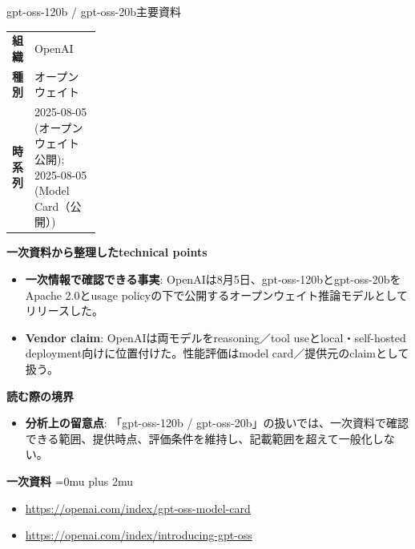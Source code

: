 \begin{technicalnote}{gpt-oss-120b / gpt-oss-20b}{主要資料}
\begingroup
\begin{tabularx}{\linewidth}{@{}>{\bfseries}p{0.22\linewidth}X@{}}
組織 & OpenAI \\
種別 & オープンウェイト \\
時系列 & 2025-08-05 (オープンウェイト公開); 2025-08-05 (Model Card（公開）) \\
\end{tabularx}
\smallskip
{\bfseries 一次資料から整理したtechnical points}
\begin{itemize}[leftmargin=1.5em,itemsep=0.35em]
\item \textbf{一次情報で確認できる事実}: OpenAIは8月5日、gpt-oss-120bとgpt-oss-20bをApache 2.0とusage policyの下で公開するオープンウェイト推論モデルとしてリリースした。
\item \textbf{Vendor claim}: OpenAIは両モデルをreasoning／tool useとlocal・self-hosted deployment向けに位置付けた。性能評価はmodel card／提供元のclaimとして扱う。
\end{itemize}
\begin{minipage}{\linewidth}
{\bfseries 読む際の境界}
\begin{itemize}[leftmargin=1.5em,itemsep=0.35em]
\item \textbf{分析上の留意点}: 「gpt-oss-120b / gpt-oss-20b」の扱いでは、一次資料で確認できる範囲、提供時点、評価条件を維持し、記載範囲を超えて一般化しない。
\end{itemize}
\begin{samepage}
{\bfseries 一次資料}
\begingroup\sloppy
\Urlmuskip=0mu plus 2mu\relax
\begin{itemize}[leftmargin=1.5em,itemsep=0.25em]
\item {\scriptsize\url{https://openai.com/index/gpt-oss-model-card}}
\item {\scriptsize\url{https://openai.com/index/introducing-gpt-oss}}
\end{itemize}
\endgroup
\end{samepage}
\end{minipage}
\endgroup
\end{technicalnote}
\medskip

